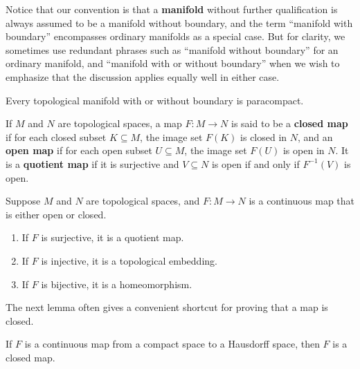 Notice that our convention is that a \textbf{manifold} without further qualification is always assumed to be a manifold without boundary, and the term ``manifold with boundary'' encompasses ordinary manifolds as a special case. But for clarity, we sometimes use redundant phrases such as ``manifold without boundary'' for an ordinary manifold, and ``manifold with or without boundary'' when we wish to emphasize that the discussion applies equally well in either case.

\begin{proposition}
\label{prop:topological-manifolds-locally-path-connected-compact}
}
Every topological manifold with or without boundary is locally path-connected and locally compact.
\end{proposition}

\begin{proposition}
\label{prop:topological-manifolds-paracompact}
Every topological manifold with or without boundary is paracompact.
\end{proposition}

If $M$ and $N$ are topological spaces, a map $F : M \to N$ is said to be a \textbf{closed map} if for each closed subset $K \subseteq M$, the image set $F(K)$ is closed in $N$, and an \textbf{open map} if for each open subset $U \subseteq M$, the image set $F(U)$ is open in $N$. It is a \textbf{quotient map} if it is surjective and $V \subseteq N$ is open if and only if $F^{-1}(V)$ is open.

\begin{proposition}
\label{prop:continuous-open-closed-maps}
Suppose $M$ and $N$ are topological spaces, and $F : M \to N$ is a continuous map that is either open or closed.
\begin{enumerate}
\item[(a)] If $F$ is surjective, it is a quotient map.
\item[(b)] If $F$ is injective, it is a topological embedding.
\item[(c)] If $F$ is bijective, it is a homeomorphism.
\end{enumerate}
\end{proposition}

The next lemma often gives a convenient shortcut for proving that a map is closed.

\begin{lemma}
\label{lem:closed-map-lemma}
If $F$ is a continuous map from a compact space to a Hausdorff space, then $F$ is a closed map.
\end{lemma}

